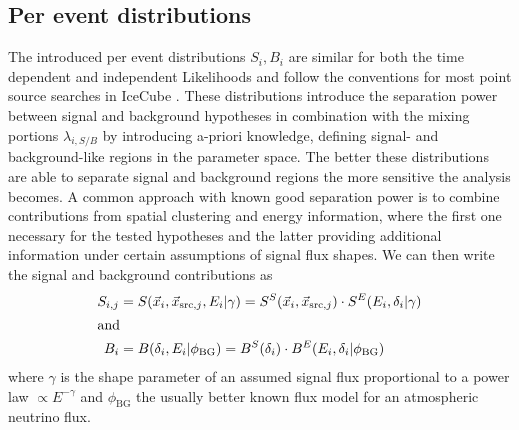 \subsection{Per event distributions}
The introduced per event distributions $S_i, B_i$ are similar for both the time dependent and independent Likelihoods and follow the conventions for most point source searches in IceCube .
These distributions introduce the separation power between signal and background hypotheses in combination with the mixing portions $\lambda_{i,S/B}$ by introducing a-priori knowledge, defining signal- and background-like regions in the parameter space.
The better these distributions are able to separate signal and background regions the more sensitive the analysis becomes.
A common approach with known good separation power is to combine contributions from spatial clustering and energy information, where the first one necessary for the tested hypotheses and the latter providing additional information under certain assumptions of signal flux shapes.
We can then write the signal and background contributions as
\begin{align}
  S_{i,j} &= S(\vec{x}_i, \vec{x}_{\mathrm{src},j}, E_i | \gamma)
    = S^S(\vec{x}_i, \vec{x}_{\mathrm{src},j})\cdot
      S^E(E_i, \delta_i | \gamma) \\
  \intertext{and}
  B_i &= B(\delta_i, E_i | \phi_\mathrm{BG})
    = B^S(\delta_i) \cdot B^E(E_i, \delta_i | \phi_\mathrm{BG})
\end{align}
where $\gamma$ is the shape parameter of an assumed signal flux proportional to a power law $\propto E^{-\gamma}$ and $\phi_\mathrm{BG}$ the usually better known flux model for an atmospheric neutrino flux.

